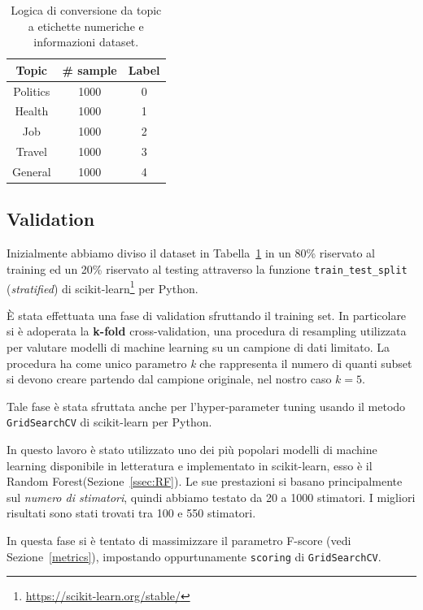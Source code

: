 \begin{table}[h!t]
\centering
\begin{tabular}{c|c|c}
\toprule
\textbf{Topic} & \textbf{\# sample} & \textbf{Label} \\ \midrule
Politics & 1000 & 0 \\ 
Health & 1000& 1 \\ 
Job & 1000& 2 \\ 
Travel & 1000& 3 \\ 
General & 1000& 4 \\ \bottomrule
\end{tabular}
\caption{Logica di conversione da topic a etichette 
numeriche e informazioni dataset.}
\label{tbl:mtc}
\end{table}

\subsection{Validation}
\label{ssec:validation_Topic}
Inizialmente abbiamo diviso il dataset in Tabella~\ref{tbl:mtc} in un 80\% riservato al training ed un 20\% riservato al testing attraverso la funzione {\tt train\_test\_split} (\textit{stratified}) di scikit-learn\footnote{\url{https://scikit-learn.org/stable/}} per Python.

È stata effettuata una fase di validation sfruttando il training set. In particolare si è adoperata la \textbf{k-fold} cross-validation, una procedura di resampling utilizzata per valutare modelli di machine learning su un campione di dati limitato. La procedura ha come unico parametro \textit{k} che rappresenta il numero di quanti subset si devono creare partendo dal campione originale, nel nostro caso $ k = 5 $.

Tale fase è stata sfruttata anche per l'hyper-parameter tuning usando il metodo {\tt GridSearchCV} di scikit-learn per Python.

In questo lavoro è stato utilizzato uno dei più popolari modelli di machine learning disponibile in letteratura e implementato in scikit-learn, esso è il Random Forest(Sezione~\ref{ssec:RF}). Le sue prestazioni si basano principalmente sul \textit{numero di stimatori}, quindi abbiamo testato da 20 a 1000 stimatori. I migliori risultati sono stati trovati tra 100 e 550 stimatori.

In questa fase si è tentato di massimizzare il parametro F-score (vedi Sezione~\ref{metrics}), impostando oppurtunamente {\tt scoring} di {\tt GridSearchCV}.

